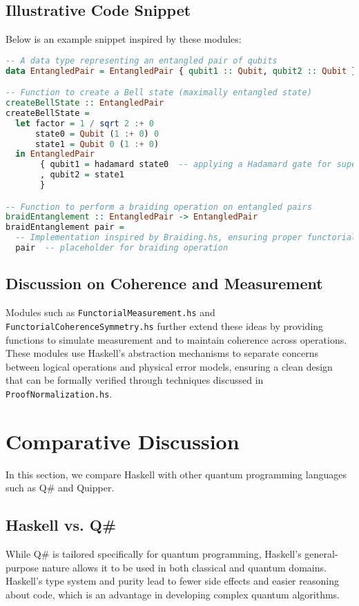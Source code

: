 \documentclass[12pt]{article}
\begin{document}
\subsection{Illustrative Code Snippet}
Below is an example snippet inspired by these modules:
\begin{lstlisting}[language=Haskell]
-- A data type representing an entangled pair of qubits
data EntangledPair = EntangledPair { qubit1 :: Qubit, qubit2 :: Qubit }

-- Function to create a Bell state (maximally entangled state)
createBellState :: EntangledPair
createBellState = 
  let factor = 1 / sqrt 2 :+ 0
      state0 = Qubit (1 :+ 0) 0
      state1 = Qubit 0 (1 :+ 0)
  in EntangledPair 
       { qubit1 = hadamard state0  -- applying a Hadamard gate for superposition
       , qubit2 = state1
       }

-- Function to perform a braiding operation on entangled pairs
braidEntanglement :: EntangledPair -> EntangledPair
braidEntanglement pair = 
  -- Implementation inspired by Braiding.hs, ensuring proper functorial mapping
  pair  -- placeholder for braiding operation
\end{lstlisting}

\subsection{Discussion on Coherence and Measurement}
Modules such as \texttt{FunctorialMeasurement.hs} and \texttt{FunctorialCoherenceSymmetry.hs} further extend these ideas by providing functions to simulate measurement and to maintain coherence across operations. These modules use Haskell’s abstraction mechanisms to separate concerns between logical operations and physical error models, ensuring a clean design that can be formally verified through techniques discussed in \texttt{ProofNormalization.hs}.

\section{Comparative Discussion}
\label{sec:discussion}
In this section, we compare Haskell with other quantum programming languages such as Q\# and Quipper.

\subsection{Haskell vs. Q\#}
While Q\# is tailored specifically for quantum programming, Haskell’s general-purpose nature allows it to be used in both classical and quantum domains. Haskell’s type system and purity lead to fewer side effects and easier reasoning about code, which is an advantage in developing complex quantum algorithms.
\end{document}
